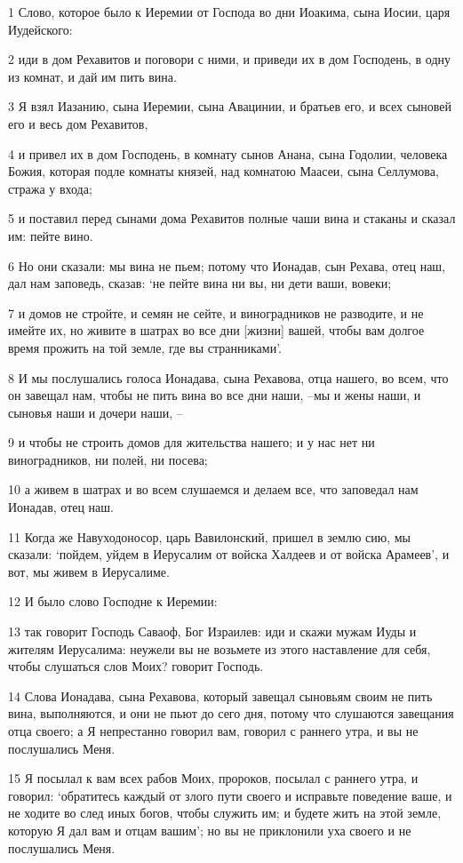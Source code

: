 \par 1 Слово, которое было к Иеремии от Господа во дни Иоакима, сына Иосии, царя Иудейского:
\par 2 иди в дом Рехавитов и поговори с ними, и приведи их в дом Господень, в одну из комнат, и дай им пить вина.
\par 3 Я взял Иазанию, сына Иеремии, сына Авацинии, и братьев его, и всех сыновей его и весь дом Рехавитов,
\par 4 и привел их в дом Господень, в комнату сынов Анана, сына Годолии, человека Божия, которая подле комнаты князей, над комнатою Маасеи, сына Селлумова, стража у входа;
\par 5 и поставил перед сынами дома Рехавитов полные чаши вина и стаканы и сказал им: пейте вино.
\par 6 Но они сказали: мы вина не пьем; потому что Ионадав, сын Рехава, отец наш, дал нам заповедь, сказав: `не пейте вина ни вы, ни дети ваши, вовеки;
\par 7 и домов не стройте, и семян не сейте, и виноградников не разводите, и не имейте их, но живите в шатрах во все дни [жизни] вашей, чтобы вам долгое время прожить на той земле, где вы странниками'.
\par 8 И мы послушались голоса Ионадава, сына Рехавова, отца нашего, во всем, что он завещал нам, чтобы не пить вина во все дни наши, --мы и жены наши, и сыновья наши и дочери наши, --
\par 9 и чтобы не строить домов для жительства нашего; и у нас нет ни виноградников, ни полей, ни посева;
\par 10 а живем в шатрах и во всем слушаемся и делаем все, что заповедал нам Ионадав, отец наш.
\par 11 Когда же Навуходоносор, царь Вавилонский, пришел в землю сию, мы сказали: `пойдем, уйдем в Иерусалим от войска Халдеев и от войска Арамеев', и вот, мы живем в Иерусалиме.
\par 12 И было слово Господне к Иеремии:
\par 13 так говорит Господь Саваоф, Бог Израилев: иди и скажи мужам Иуды и жителям Иерусалима: неужели вы не возьмете из этого наставление для себя, чтобы слушаться слов Моих? говорит Господь.
\par 14 Слова Ионадава, сына Рехавова, который завещал сыновьям своим не пить вина, выполняются, и они не пьют до сего дня, потому что слушаются завещания отца своего; а Я непрестанно говорил вам, говорил с раннего утра, и вы не послушались Меня.
\par 15 Я посылал к вам всех рабов Моих, пророков, посылал с раннего утра, и говорил: `обратитесь каждый от злого пути своего и исправьте поведение ваше, и не ходите во след иных богов, чтобы служить им; и будете жить на этой земле, которую Я дал вам и отцам вашим'; но вы не приклонили уха своего и не послушались Меня.
